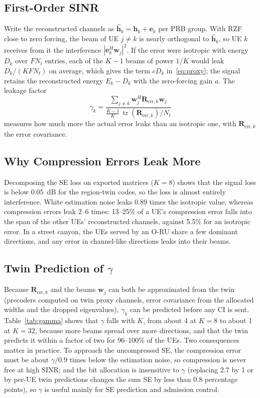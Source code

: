 \documentclass[journal]{IEEEtran}
\newcommand{\vect}[1]{\mathbf{#1}}
\DeclareMathOperator{\tr}{tr}
\begin{document}
\subsection{First-Order SINR}
Write the reconstructed channels as $\hat{\vect{h}}_{k}=\vect{h}_{k}+\vect{e}_{k}$ per PRB group. With RZF close to zero forcing, the beam of UE $j\ne k$ is nearly orthogonal to $\hat{\vect{h}}_k$, so UE $k$ receives from it the interference $|\vect{e}_k^{H}\vect{w}_j|^2$. If the error were isotropic with energy $D_k$ over $FN_t$ entries, each of the $K-1$ beams of power $1/K$ would leak $D_k/(KFN_t)$ on average, which gives the term $cD_k$ in~\eqref{eq:proxy}; the signal retains the reconstructed energy $E_k-D_k$ with the zero-forcing gain $a$. The leakage factor
\begin{equation}
\gamma_k=\frac{\sum_{j\ne k}\vect{w}_j^{H}\vect{R}_{\mathrm{err},k}\vect{w}_j}{\frac{K-1}{K}\,\tr(\vect{R}_{\mathrm{err},k})/N_t}
\end{equation}
measures how much more the actual error leaks than an isotropic one, with $\vect{R}_{\mathrm{err},k}$ the error covariance.

\subsection{Why Compression Errors Leak More}
Decomposing the SE loss on exported matrices ($K=8$) shows that the signal loss is below 0.05~dB for the region-twin codes, so the loss is almost entirely interference. White estimation noise leaks 0.89 times the isotropic value, whereas compression errors leak 2--6 times: 13--25\% of a UE's compression error falls into the span of the other UEs' reconstructed channels, against 5.5\% for an isotropic error. In a street canyon, the UEs served by an O-RU share a few dominant directions, and any error in channel-like directions leaks into their beams.

\subsection{Twin Prediction of $\gamma$}
Because $\vect{R}_{\mathrm{err},k}$ and the beams $\vect{w}_j$ can both be approximated from the twin (precoders computed on twin proxy channels, error covariance from the allocated widths and the dropped eigenvalues), $\gamma_k$ can be predicted before any CI is sent. Table~\ref{tab:gamma} shows that $\gamma$ falls with $K$, from about 4 at $K=8$ to about 1 at $K=32$, because more beams spread over more directions, and that the twin predicts it within a factor of two for 96--100\% of the UEs. Two consequences matter in practice. To approach the uncompressed SE, the compression error must be about $\gamma/0.9$ times below the estimation noise, so compression is never free at high SINR; and the bit allocation is insensitive to $\gamma$ (replacing 2.7 by 1 or by per-UE twin predictions changes the sum SE by less than 0.8 percentage points), so $\gamma$ is useful mainly for SE prediction and admission control.
\end{document}
